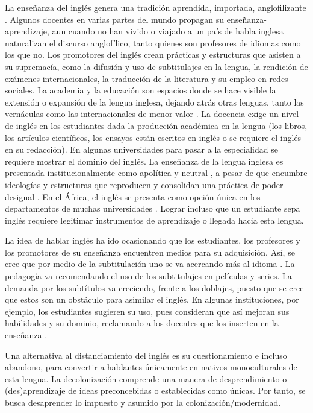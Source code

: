 \documentclass[spanish]{textolivre}
\begin{document}
La enseñanza del inglés genera una tradición aprendida, importada, anglofilizante \cite{despagne_modernidad_2016}. Algunos docentes en varias partes del mundo propagan su enseñanza-aprendizaje, aun cuando no han vivido o viajado a un país de habla inglesa naturalizan el discurso anglofílico, tanto quienes son profesores de idiomas como los que no. Los promotores del inglés crean prácticas y estructuras que asisten a su supremacía, como la difusión y uso de subtitulajes en la lengua, la rendición de exámenes internacionales, la traducción de la literatura y su empleo en redes sociales. La academia y la educación son espacios donde se hace visible la extensión o expansión de la lengua inglesa, dejando atrás otras lenguas, tanto las vernáculas como las internacionales de menor valor \cite{despagne_modernidad_2016}. La docencia exige un nivel de inglés en los estudiantes dada la producción académica en la lengua (los libros, los artículos científicos, los ensayos están escritos en inglés o se requiere el inglés en su redacción). En algunas universidades para pasar a la especialidad se requiere mostrar el dominio del inglés. La enseñanza de la lengua inglesa es presentada institucionalmente como apolítica y neutral \cite{guerrero2009english}, a pesar de que encumbre ideologías y estructuras que reproducen y consolidan una práctica de poder desigual \cite{phillipson1992linguistic}. En el África, el inglés se presenta como opción única en los departamentos de muchas universidades \cite{thiongo_decolonising_1994}. Lograr incluso que un estudiante sepa inglés requiere legitimar instrumentos de aprendizaje o llegada hacia esta lengua.

La idea de hablar inglés ha ido ocasionando que los estudiantes, los profesores y los promotores de su enseñanza encuentren medios para su adquisición. Así, se cree que por medio de la subtitulación uno se va acercando más al idioma \cite{torralba-miralles_uso_2020}. La pedagogía va recomendando el uso de los subtitulajes en películas y series. La demanda por los subtítulos va creciendo, frente a los doblajes, puesto que se cree que estos son un obstáculo para asimilar el inglés. En algunas instituciones, por ejemplo, los estudiantes sugieren su uso, pues consideran que así mejoran sus habilidades y su dominio, reclamando a los docentes que los inserten en la enseñanza \cite{jude2019subtitulacion}.

Una alternativa al distanciamiento del inglés es su cuestionamiento e incluso abandono, para convertir a hablantes únicamente en nativos monoculturales de esta lengua. La decolonización comprende una manera de desprendimiento o (des)aprendizaje \cite{palermo_para_2014} de ideas preconcebidas o establecidas como únicas. Por tanto, se busca desaprender lo impuesto y asumido por la colonización/modernidad.
\end{document}
